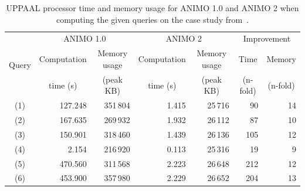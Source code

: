 \documentclass{bmcart}
\def\animo2{ANIMO 2}
\begin{document}
\begin{backmatter}
\begin{table}[h!]
\scriptsize
  \begin{center}
    \begin{tabular}{|c||r|r||r|r||r|r|}
      \hline
       \multirow{3}{*}{Query} & \multicolumn{2}{c||}{ANIMO 1.0}	   & \multicolumn{2}{c||}{\animo2{}} & \multicolumn{2}{c|}{Improvement}\\
      \cline{2-7}
       & \multicolumn{1}{c|}{Computation} & \multicolumn{1}{c||}{Memory usage} & \multicolumn{1}{c|}{Computation} & \multicolumn{1}{c||}{Memory usage} & \multicolumn{1}{c|}{Time} & \multicolumn{1}{c|}{Memory} \\
       & \multicolumn{1}{c|}{time (s)}    & \multicolumn{1}{c||}{(peak KB)}    & \multicolumn{1}{c|}{time (s)} & \multicolumn{1}{c||}{(peak KB)} & \multicolumn{1}{c|}{(n-fold)} & \multicolumn{1}{c|}{(n-fold)}\\
      \hline
      \hline
      (1) & 127.248 & 351\,{}804 & 1.415 & 25\,{}716 & 90 & 14 \\
      \hline
      (2) & 167.635 & 269\,{}932 & 1.932 & 26\,{}112 & 87 & 10 \\
      \hline
      (3) & 150.901 & 318\,{}460 & 1.439 & 26\,{}136 & 105 & 12 \\
      \hline
      (4) & 2.154 & 216\,{}920 & 0.113 & 25\,{}316 & 19 & 9 \\
      \hline
      (5) & 470.560 & 311\,{}568 & 2.223 & 26\,{}648 & 212 & 12 \\
      \hline
      (6) & 453.900 & 357\,{}980 & 2.229 & 26\,{}652 & 204 & 13 \\
      \hline
    \end{tabular}
  \end{center}
  \caption{UPPAAL processor time and memory usage for ANIMO 1.0 and \animo2{} when computing
  the given queries on the case study from~\cite{animo-bibe}.\label{tab:model-checking}}
\end{table}



\end{backmatter}
\end{document}
